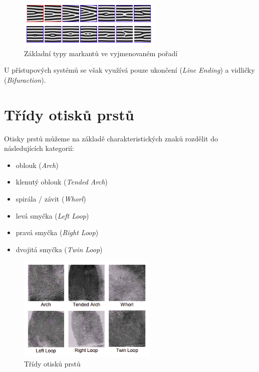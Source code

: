 \begin{figure}[!htbp]
    \centering
    \includegraphics[width=260px]{obrazky-figures/markants.png}
    \caption{Základní typy markantů ve vyjmenovaném pořadí \cite{Drahansky}}
\end{figure}

U přístupových systémů se však využívá pouze ukončení (\textit{Line Ending}) a vidličky (\textit{Bifuraction}). \cite{Drahansky}

\section{Třídy otisků prstů}
Otisky prstů můžeme na základě charakteristických znaků rozdělit do následujících kategorií: \cite{Drahansky}
\begin{itemize}
    \item oblouk (\textit{Arch})
    \item klenutý oblouk (\textit{Tended Arch})
    \item spirála / závit (\textit{Whorl})
    \item levá smyčka (\textit{Left Loop})
    \item pravá smyčka (\textit{Right Loop})
    \item dvojitá smyčka (\textit{Twin Loop})
\end{itemize}

\begin{figure}[!htbp]
    \centering
    \includegraphics[width=250px]{obrazky-figures/classes.png}
    \caption{Třídy otisků prstů \cite{Drahansky}}
\end{figure}


